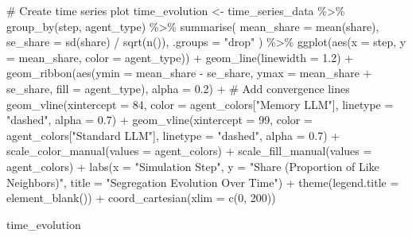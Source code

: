 \documentclass[
  11pt,
]{article}
\newenvironment{Shaded}{\begin{snugshade}}{\end{snugshade}}
\newcommand{\AttributeTok}[1]{\textcolor[rgb]{0.40,0.45,0.13}{#1}}
\newcommand{\CommentTok}[1]{\textcolor[rgb]{0.37,0.37,0.37}{#1}}
\newcommand{\DecValTok}[1]{\textcolor[rgb]{0.68,0.00,0.00}{#1}}
\newcommand{\FloatTok}[1]{\textcolor[rgb]{0.68,0.00,0.00}{#1}}
\newcommand{\FunctionTok}[1]{\textcolor[rgb]{0.28,0.35,0.67}{#1}}
\newcommand{\NormalTok}[1]{\textcolor[rgb]{0.00,0.23,0.31}{#1}}
\newcommand{\OtherTok}[1]{\textcolor[rgb]{0.00,0.23,0.31}{#1}}
\newcommand{\SpecialCharTok}[1]{\textcolor[rgb]{0.37,0.37,0.37}{#1}}
\newcommand{\StringTok}[1]{\textcolor[rgb]{0.13,0.47,0.30}{#1}}
\begin{document}
\begin{Shaded}
\begin{Highlighting}[]
\CommentTok{\# Create time series plot}
\NormalTok{time\_evolution }\OtherTok{\textless{}{-}}\NormalTok{ time\_series\_data }\SpecialCharTok{\%\textgreater{}\%}
  \FunctionTok{group\_by}\NormalTok{(step, agent\_type) }\SpecialCharTok{\%\textgreater{}\%}
  \FunctionTok{summarise}\NormalTok{(}
    \AttributeTok{mean\_share =} \FunctionTok{mean}\NormalTok{(share),}
    \AttributeTok{se\_share =} \FunctionTok{sd}\NormalTok{(share) }\SpecialCharTok{/} \FunctionTok{sqrt}\NormalTok{(}\FunctionTok{n}\NormalTok{()),}
    \AttributeTok{.groups =} \StringTok{"drop"}
\NormalTok{  ) }\SpecialCharTok{\%\textgreater{}\%}
  \FunctionTok{ggplot}\NormalTok{(}\FunctionTok{aes}\NormalTok{(}\AttributeTok{x =}\NormalTok{ step, }\AttributeTok{y =}\NormalTok{ mean\_share, }\AttributeTok{color =}\NormalTok{ agent\_type)) }\SpecialCharTok{+}
  \FunctionTok{geom\_line}\NormalTok{(}\AttributeTok{linewidth =} \FloatTok{1.2}\NormalTok{) }\SpecialCharTok{+}
  \FunctionTok{geom\_ribbon}\NormalTok{(}\FunctionTok{aes}\NormalTok{(}\AttributeTok{ymin =}\NormalTok{ mean\_share }\SpecialCharTok{{-}}\NormalTok{ se\_share, }
                  \AttributeTok{ymax =}\NormalTok{ mean\_share }\SpecialCharTok{+}\NormalTok{ se\_share,}
                  \AttributeTok{fill =}\NormalTok{ agent\_type), }
              \AttributeTok{alpha =} \FloatTok{0.2}\NormalTok{) }\SpecialCharTok{+}
  \CommentTok{\# Add convergence lines}
  \FunctionTok{geom\_vline}\NormalTok{(}\AttributeTok{xintercept =} \DecValTok{84}\NormalTok{, }\AttributeTok{color =}\NormalTok{ agent\_colors[}\StringTok{"Memory LLM"}\NormalTok{], }
             \AttributeTok{linetype =} \StringTok{"dashed"}\NormalTok{, }\AttributeTok{alpha =} \FloatTok{0.7}\NormalTok{) }\SpecialCharTok{+}
  \FunctionTok{geom\_vline}\NormalTok{(}\AttributeTok{xintercept =} \DecValTok{99}\NormalTok{, }\AttributeTok{color =}\NormalTok{ agent\_colors[}\StringTok{"Standard LLM"}\NormalTok{], }
             \AttributeTok{linetype =} \StringTok{"dashed"}\NormalTok{, }\AttributeTok{alpha =} \FloatTok{0.7}\NormalTok{) }\SpecialCharTok{+}
  \FunctionTok{scale\_color\_manual}\NormalTok{(}\AttributeTok{values =}\NormalTok{ agent\_colors) }\SpecialCharTok{+}
  \FunctionTok{scale\_fill\_manual}\NormalTok{(}\AttributeTok{values =}\NormalTok{ agent\_colors) }\SpecialCharTok{+}
  \FunctionTok{labs}\NormalTok{(}\AttributeTok{x =} \StringTok{"Simulation Step"}\NormalTok{, }
       \AttributeTok{y =} \StringTok{"Share (Proportion of Like Neighbors)"}\NormalTok{,}
       \AttributeTok{title =} \StringTok{"Segregation Evolution Over Time"}\NormalTok{) }\SpecialCharTok{+}
  \FunctionTok{theme}\NormalTok{(}\AttributeTok{legend.title =} \FunctionTok{element\_blank}\NormalTok{()) }\SpecialCharTok{+}
  \FunctionTok{coord\_cartesian}\NormalTok{(}\AttributeTok{xlim =} \FunctionTok{c}\NormalTok{(}\DecValTok{0}\NormalTok{, }\DecValTok{200}\NormalTok{))}

\NormalTok{time\_evolution}
\end{Highlighting}
\end{Shaded}
\end{document}
